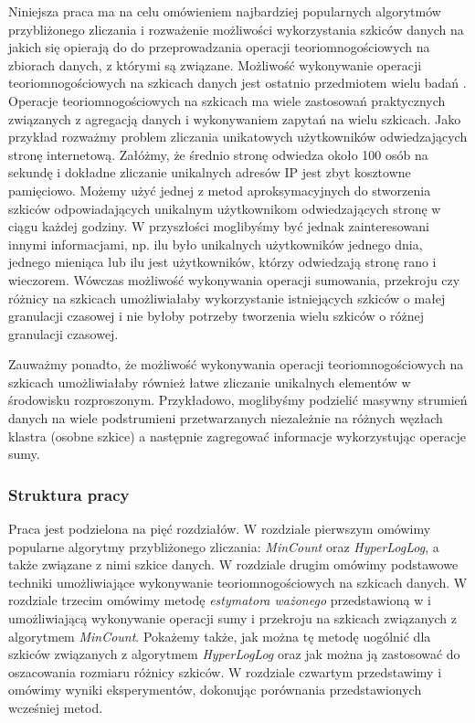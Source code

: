 Niniejsza praca ma na celu omówieniem najbardziej popularnych algorytmów przybliżonego zliczania i rozważenie możliwości wykorzystania szkiców danych
na jakich się opierają do do przeprowadzania operacji teoriomnogościowych na zbiorach danych, z którymi są związane.  Możliwość wykonywanie operacji teoriomnogościowych na szkicach danych jest ostatnio przedmiotem wielu badań \cite{ting} \cite{oertl} \cite{adroll}.
Operacje teoriomnogościowych na szkicach ma wiele zastosowań praktycznych związanych z agregacją danych i  wykonywaniem  zapytań na wielu szkicach. Jako przykład rozważmy problem zliczania unikatowych użytkowników odwiedzających stronę internetową. Załóżmy, że średnio stronę odwiedza około 100 osób na sekundę i dokładne zliczanie unikalnych adresów IP jest zbyt kosztowne pamięciowo. Możemy użyć jednej z metod aproksymacyjnych do stworzenia szkiców odpowiadających unikalnym użytkownikom odwiedzających stronę  w ciągu każdej godziny. W przyszłości moglibyśmy być jednak zainteresowani innymi informacjami, np. ilu było
unikalnych użytkowników jednego dnia, jednego mieniąca
lub ilu jest użytkowników, którzy odwiedzają stronę rano i wieczorem.   
Wówczas możliwość wykonywania operacji sumowania, przekroju czy różnicy na szkicach umożliwiałaby wykorzystanie istniejących szkiców o małej granulacji czasowej i nie byłoby potrzeby tworzenia wielu szkiców o różnej granulacji czasowej. 

Zauważmy ponadto, że możliwość wykonywania operacji 
teoriomnogościowych na szkicach umożliwiałaby również
łatwe zliczanie unikalnych elementów w środowisku rozproszonym. Przykładowo, moglibyśmy podzielić masywny strumień danych na wiele podstrumieni przetwarzanych niezależnie na różnych węzłach klastra (osobne szkice)
a następnie zagregować informacje wykorzystując operacje sumy.

\subsubsection{Struktura pracy}
Praca jest podzielona na pięć rozdziałów. W rozdziale pierwszym omówimy popularne algorytmy przybliżonego zliczania: \textit{MinCount} oraz \textit{HyperLogLog}, a także związane z nimi szkice danych. 
W rozdziale drugim omówimy podstawowe techniki 
umożliwiające wykonywanie  teoriomnogościowych na szkicach danych. W rozdziale trzecim omówimy metodę \textit{estymatora ważonego} przedstawioną w \cite{ting} i umożliwiającą wykonywanie operacji sumy i przekroju na szkicach związanych z algorytmem \textit{MinCount}. Pokażemy także, jak można tę metodę uogólnić dla szkiców związanych z algorytmem \textit{HyperLogLog} oraz jak można ją zastosować do oszacowania rozmiaru różnicy szkiców. W rozdziale czwartym przedstawimy i omówimy wyniki eksperymentów, dokonując porównania przedstawionych wcześniej metod.